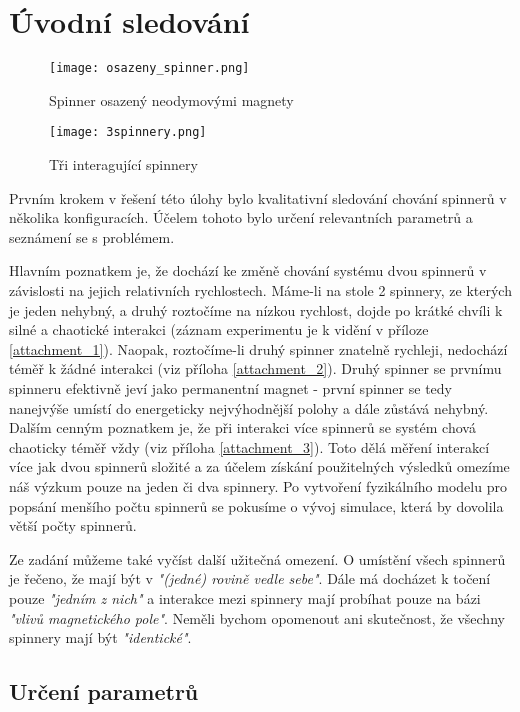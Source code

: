 \chapter{Úvodní sledování}
\begin{wrapfigure}{r}{0.4\textwidth}
    \vspace*{1cm}
    \texttt{[image: osazeny\_spinner.png]}
    \centering
    \caption{Spinner osazený neodymovými magnety}
    \label{fig:1spinner}

    \vspace*{2.5cm}
    \texttt{[image: 3spinnery.png]}
    \centering
    \caption{Tři interagující spinnery}
    \label{fig:3spinners}
\end{wrapfigure}

Prvním krokem v řešení této úlohy bylo kvalitativní sledování chování spinnerů v několika konfiguracích. Účelem tohoto bylo určení relevantních parametrů a seznámení se s problémem.

Hlavním poznatkem je, že dochází ke změně chování systému dvou spinnerů v závislosti na jejich relativních rychlostech.
Máme-li na stole 2 spinnery, ze kterých je jeden nehybný, a druhý roztočíme na nízkou rychlost, dojde po krátké chvíli k silné a chaotické interakci (záznam experimentu je k vidění v příloze \ref{attachment_1}).
Naopak, roztočíme-li druhý spinner znatelně rychleji, nedochází téměř k žádné interakci (viz příloha \ref{attachment_2}).
Druhý spinner se prvnímu spinneru efektivně jeví jako permanentní magnet - první spinner se tedy nanejvýše umístí do energeticky nejvýhodnější polohy a dále zůstává nehybný.
Dalším cenným poznatkem je, že při interakci více spinnerů se systém chová chaoticky téměř vždy (viz příloha \ref{attachment_3}).
Toto dělá měření interakcí více jak dvou spinnerů složité a za účelem získání použitelných výsledků omezíme náš výzkum pouze na jeden či dva spinnery.
Po vytvoření fyzikálního modelu pro popsání menšího počtu spinnerů se pokusíme o vývoj simulace, která by dovolila větší počty spinnerů.

Ze zadání můžeme také vyčíst další užitečná omezení.
O umístění všech spinnerů je řečeno, že mají být v \textit{"(jedné) rovině vedle sebe"}. Dále má docházet k točení pouze \textit{"jedním z nich"} a interakce mezi spinnery mají probíhat pouze na bázi \textit{"vlivů magnetického pole"}.
Neměli bychom opomenout ani skutečnost, že všechny spinnery mají být \textit{"identické"}.
\clearpage

\section{Určení parametrů}

